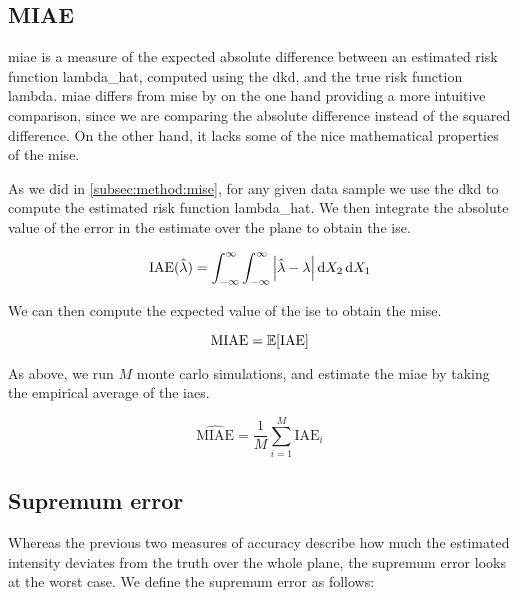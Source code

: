 \subsection{MIAE}
\label{subsec:method:miae}

\Gls{miae} is a measure of the expected absolute difference between an estimated risk function \gls{lambda_hat},
computed using the \gls{dkd}, and the true risk function \gls{lambda}.
\Gls{miae} differs from \gls{mise} by on the one hand providing a more intuitive comparison,
since we are comparing the absolute difference instead of the squared difference.
On the other hand, it lacks some of the nice mathematical properties of the \gls{mise}.

As we did in \autoref{subsec:method:mise}, for any given data sample we use the \gls{dkd} to compute the estimated risk function \gls{lambda_hat}.
We then integrate the absolute value of the error in the estimate over the plane to obtain the \gls{ise}.

\begin{equation}
    \mbox{IAE}(\hat{\lambda}) = \int_{-\infty}^{\infty} \int_{-\infty}^{\infty} \left| \hat{\lambda} - \lambda \right| \mathop{}\!\mathrm{d}{X_2} \mathop{}\!\mathrm{d}{X_1}
\end{equation}

We can then compute the expected value of the \gls{ise} to obtain the \gls{mise}.

\begin{equation}
    \mbox{MIAE} = \mathbb{E} [\mbox{IAE}]
\end{equation}

As above, we run \(M\) monte carlo simulations, and estimate the \gls{miae} by taking the empirical average of the \glspl{iae}.

\begin{equation}
    \hat{\mbox{MIAE}} = \frac{1}{M} \sum_{i=1}^{M} \mbox{IAE}_i
\end{equation}

\subsection{Supremum error}
\label{subsec:method:sup_error}

Whereas the previous two measures of accuracy describe how much the estimated intensity deviates from the truth over the whole plane,
the \gls{supremum error} looks at the worst case.
We define the \gls{supremum error} as follows:

